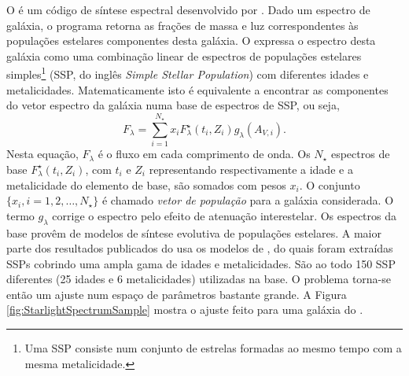 O \starlight é um código de síntese espectral desenvolvido por
\citet{CidFernandes2005}. Dado um espectro de galáxia, o programa retorna as
frações de massa e luz correspondentes às populações estelares componentes desta
galáxia. O \starlight expressa o espectro desta galáxia como uma combinação
linear de espectros de populações estelares simples\footnote{Uma SSP consiste
num conjunto de estrelas formadas ao mesmo tempo com a mesma metalicidade.}
(SSP, do inglês {\em Simple Stellar Population}) com diferentes idades e
metalicidades. Matematicamente isto é equivalente a encontrar as componentes do
vetor espectro da galáxia numa base de espectros de SSP, ou seja,
\[
F_\lambda = \sum_{i=1}^{N_\star} x_i F^\star_\lambda(t_i,Z_i)
g_\lambda(A_{V,i}).
\]
Nesta equação, $F_\lambda$ é o fluxo em cada comprimento de onda. Os $N_\star$
espectros de base $F^\star_\lambda(t_i, Z_i)$, com $t_i$ e $Z_i$ representando
respectivamente a idade e a metalicidade do elemento de base, são somados com
pesos $x_i$. O conjunto $\{x_i, i=1,2,\ldots,N_\star\}$ é chamado {\em vetor de
população} para a galáxia considerada. O termo $g_\lambda$ corrige o espectro
pelo efeito de atenuação interestelar. Os espectros da base provêm de modelos de
síntese evolutiva de populações estelares. A maior parte dos resultados
publicados do \starlight usa os modelos de \citet[BC03]{Bruzual2003}, do quais
foram extraídas SSPs cobrindo uma ampla gama de idades e metalicidades. São ao
todo 150 SSP diferentes (25 idades e 6 metalicidades) utilizadas na base. O
problema torna-se então um ajuste num espaço de parâmetros bastante grande. A
Figura \ref{fig:StarlightSpectrumSample} mostra o ajuste feito para uma galáxia
do \SDSS.


